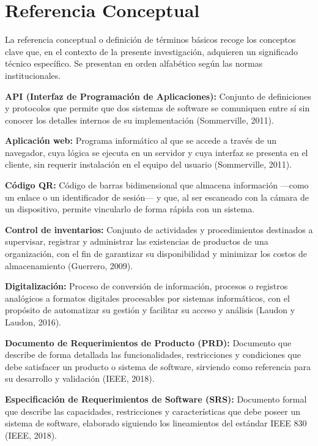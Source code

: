 \documentclass[12pt, letterpaper]{report}
\begin{document}
\section{Referencia Conceptual}

La referencia conceptual o definición de términos básicos recoge los
conceptos clave que, en el contexto de la presente investigación,
adquieren un significado técnico específico. Se presentan en orden
alfabético según las normas institucionales.

\textbf{API (Interfaz de Programación de Aplicaciones):} Conjunto de
definiciones y protocolos que permite que dos sistemas de software se
comuniquen entre sí sin conocer los detalles internos de su
implementación (Sommerville, 2011).

\textbf{Aplicación web:} Programa informático al que se accede a través
de un navegador, cuya lógica se ejecuta en un servidor y cuya interfaz
se presenta en el cliente, sin requerir instalación en el equipo del
usuario (Sommerville, 2011).

\textbf{Código QR:} Código de barras bidimensional que almacena
información ---como un enlace o un identificador de sesión--- y que,
al ser escaneado con la cámara de un dispositivo, permite vincularlo
de forma rápida con un sistema.

\textbf{Control de inventarios:} Conjunto de actividades y
procedimientos destinados a supervisar, registrar y administrar las
existencias de productos de una organización, con el fin de garantizar
su disponibilidad y minimizar los costos de almacenamiento
(Guerrero, 2009).

\textbf{Digitalización:} Proceso de conversión de información, procesos
o registros analógicos a formatos digitales procesables por sistemas
informáticos, con el propósito de automatizar su gestión y facilitar
su acceso y análisis (Laudon y Laudon, 2016).

\textbf{Documento de Requerimientos de Producto (PRD):} Documento que
describe de forma detallada las funcionalidades, restricciones y
condiciones que debe satisfacer un producto o sistema de software,
sirviendo como referencia para su desarrollo y validación (IEEE, 2018).

\textbf{Especificación de Requerimientos de Software (SRS):} Documento
formal que describe las capacidades, restricciones y características
que debe poseer un sistema de software, elaborado siguiendo los
lineamientos del estándar IEEE 830 (IEEE, 2018).
\end{document}

